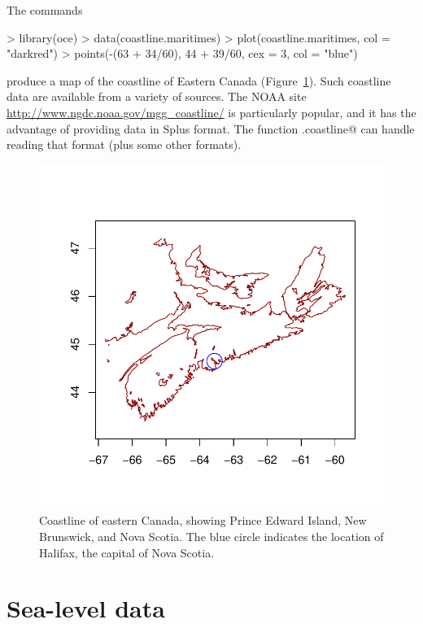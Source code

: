 \documentclass{article}
\begin{document}
The commands
\begin{Schunk}
\begin{Sinput}
> library(oce)
> data(coastline.maritimes)
> plot(coastline.maritimes, col = "darkred")
> points(-(63 + 34/60), 44 + 39/60, cex = 3, col = "blue")
\end{Sinput}
\end{Schunk}
produce a map of the coastline of Eastern Canada
(Figure~\ref{fig:coastline}). Such coastline data are available from a variety
of sources. The NOAA site \url{http://www.ngdc.noaa.gov/mgg_coastline/} is
particularly popular, and it has the advantage of providing data in Splus
format.  The function \verb@read.coastline@ can handle reading that format (plus
some other formats).
\begin{figure}
\begin{center}
\includegraphics{oce-coastlinefig}
\end{center}
\caption{Coastline of eastern Canada, showing Prince Edward Island, New
Brunswick, and Nova Scotia.  The blue circle indicates the location of Halifax,
the capital of Nova Scotia.}
\label{fig:coastline}
\end{figure}

\section{Sea-level data}
\end{document}
